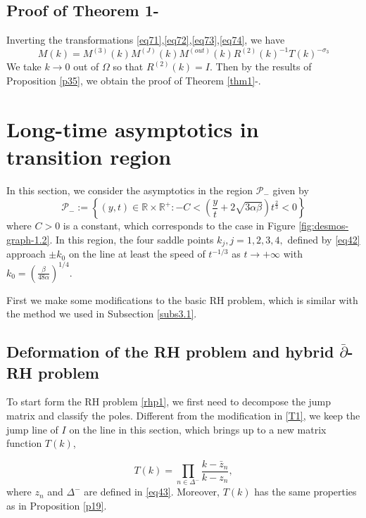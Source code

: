 \documentclass[11pt]{article}
\numberwithin{equation}{section}
\begin{document}
\subsection{Proof of Theorem 1-\uppercase\expandafter{}}
Inverting the transformations \eqref{eq71},\eqref{eq72},\eqref{eq73},\eqref{eq74}, we have
\begin{equation}
    M(k)=M^{(3)}(k)M^{(J)}(k)M^{(out)}(k)R^{(2)}(k)^{-1}T(k)^{-\sigma_3}
\end{equation}
We take $k\to 0$ out of $\Omega$ so that $R^{(2)}(k)=I$. Then by the results of Proposition \ref{p35}, we obtain the proof of Theorem \ref{thm1}-\uppercase\expandafter{}.

\section{Long-time asymptotics in transition region}\label{sec4}

In this section, we  consider  the asymptotics    in the region $\mathcal{P_-}$ given by
\begin{equation*}
    \mathcal{P}_{-}:= \left\{ (y,t)\in \mathbb{R}\times\mathbb{R}^+: -C< \left(\frac{y}{t}+2\sqrt{3\alpha\beta}\right) t^{\frac{2}{3}}<0 \right\}
\end{equation*}
where $C>0$ is a constant, which corresponds to the case in  Figure \ref{fig:desmos-graph-1.2}. In this region, the four  saddle points $k_j,j=1,2,3,4,$ defined by \eqref{eq42}  approach $\pm k_0$ on the line at least the speed of $t^{-1/3}$ as $t\to +\infty$ with $k_0=\left(\frac{\beta}{48\alpha}\right)^{1/4}$.

 First we make some modifications to the basic  RH problem, which is similar with the method we used in Subsection \ref{subs3.1}.

\subsection{Deformation of the RH problem and hybrid $\bar\partial$-RH problem}\label{sec4.1}
 To start form the RH problem \ref{rhp1}, we first need to decompose the jump matrix and classify the poles. Different from the modification in \eqref{T1}, we keep the jump line of $I$ on the line in this section, which brings up to a new matrix function $T(k)$,

 \begin{equation} \label{eq51}
    T(k)=\prod\limits_{n\in\Delta^-}\frac{k-\bar{z}_n}{k-z_n},
\end{equation}
where $z_n$ and $\Delta^-$ are defined in \eqref{eq43}. Moreover, $T(k)$ has the same properties as in Proposition \ref{p19}.
\end{document}
